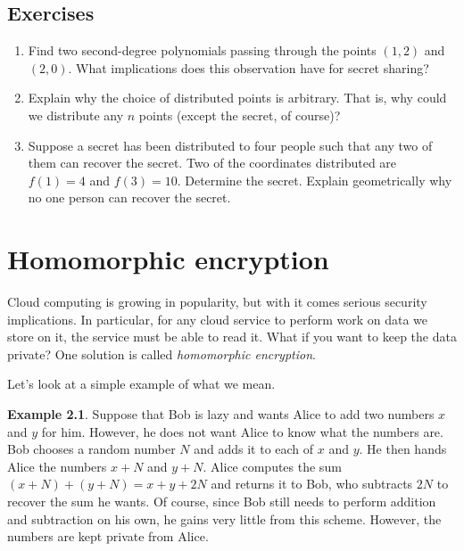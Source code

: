 \documentclass{book}
\theoremstyle{plain}
\theoremstyle{definition}
\newtheorem{example}[theorem]{Example}
\newif\ifprintsolutions
\newcommand{\solution}[1]{\ifprintsolutions \begin{sloppypar}{\it #1}\end{sloppypar} \fi} %
\begin{document}
\section{Exercises}
\begin{enumerate}
\item Find two second-degree polynomials passing through the points $(1,2)$ and $(2,0)$. What implications does this observation have for secret sharing? \solution{Examples include $x^2-5x+6$ and $-x^2+x+2$.}
\item Explain why the choice of distributed points is arbitrary. That is, why could we distribute any $n$ points (except the secret, of course)? \solution{Any $k$ points uniquely determine a polynomial of degree $k-1$.}
\item Suppose a secret has been distributed to four people such that any two of them can recover the secret. Two of the coordinates distributed are $f(1) = 4$ and $f(3) = 10$. Determine the secret. Explain geometrically why no one person can recover the secret. \solution{The polynomial is $3x+1$, so the secret is $1$. Since infinitely many lines pass through any given point, no one person can recover the secret.}
\end{enumerate}

\chapter{Homomorphic encryption}
Cloud computing is growing in popularity, but with it comes serious security implications. In particular, for any cloud service to perform work on data we store on it, the service must be able to read it. What if you want to keep the data private? One solution is called {\it homomorphic encryption}.

Let's look at a simple example of what we mean.

\begin{example}
Suppose that Bob is lazy and wants Alice to add two numbers $x$ and $y$ for him. However, he does not want Alice to know what the numbers are. Bob chooses a random number $N$ and adds it to each of $x$ and $y$. He then hands Alice the numbers $x+N$ and $y+N$. Alice computes the sum $(x+N)+(y+N) = x+y+2N$ and returns it to Bob, who subtracts $2N$ to recover the sum he wants. Of course, since Bob still needs to perform addition and subtraction on his own, he gains very little from this scheme. However, the numbers are kept private from Alice.
\end{example}
\end{document}
